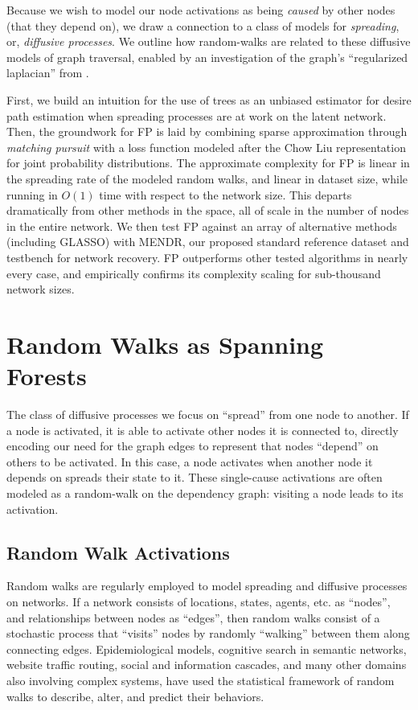 \documentclass[%
	12pt,
		oneside,
		letterpaper
]{book}
\begin{document}
Because we wish to model our node activations as being \emph{caused} by
other nodes (that they depend on), we draw a connection to a class of
models for \emph{spreading}, or, \emph{diffusive processes}. We outline
how random-walks are related to these diffusive models of graph
traversal, enabled by an investigation of the graph's ``regularized
laplacian'' from \textcite{Semisupervisedlearning_Avrachenkov2017}.

First, we build an intuition for the use of trees as an unbiased
estimator for desire path estimation when spreading processes are at
work on the latent network. Then, the groundwork for FP is laid by
combining sparse approximation through \emph{matching pursuit} with a
loss function modeled after the Chow Liu representation for joint
probability distributions. The approximate complexity for FP is linear
in the spreading rate of the modeled random walks, and linear in dataset
size, while running in \(O(1)\) time with respect to the network size.
This departs dramatically from other methods in the space, all of scale
in the number of nodes in the entire network. We then test FP against an
array of alternative methods (including GLASSO) with MENDR, our proposed
standard reference dataset and testbench for network recovery. FP
outperforms other tested algorithms in nearly every case, and
empirically confirms its complexity scaling for sub-thousand network
sizes.

\section{Random Walks as Spanning
Forests}\label{random-walks-as-spanning-forests}

The class of diffusive processes we focus on ``spread'' from one node to
another. If a node is activated, it is able to activate other nodes it
is connected to, directly encoding our need for the graph edges to
represent that nodes ``depend'' on others to be activated. In this case,
a node activates when another node it depends on spreads their state to
it. These single-cause activations are often modeled as a random-walk on
the dependency graph: visiting a node leads to its activation.

\subsection{Random Walk Activations}\label{random-walk-activations}

Random walks are regularly employed to model spreading and diffusive
processes on networks. If a network consists of locations, states,
agents, etc. as ``nodes'', and relationships between nodes as ``edges'',
then random walks consist of a stochastic process that ``visits'' nodes
by randomly ``walking'' between them along connecting edges.
Epidemiological models, cognitive search in semantic networks, website
traffic routing, social and information cascades, and many other domains
also involving complex systems, have used the statistical framework of
random walks to describe, alter, and predict their behaviors.
\autocite{effectivenessrandomwalks_Kim2023,RobustCascadeReconstruction_Xiao2018,Humanmemorysearch_Jun2015,RandomWalksElectric_Doyle2000,MarkovPerspectiveDevelopment_Mane2011}
\end{document}
